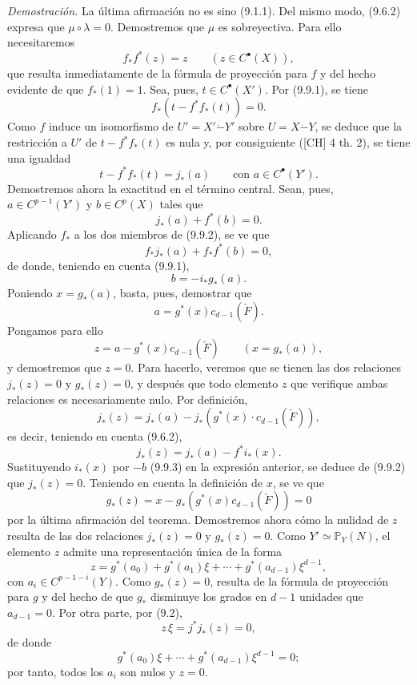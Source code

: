 \emph{Demostración.} La última afirmación no es sino (9.1.1). Del mismo modo, (9.6.2) expresa que $\mu\circ\lambda=0$. Demostremos que $\mu$ es sobreyectiva. Para ello necesitaremos
\[
f_*f^*(z)=z\qquad(z\in C^{\bullet}(X)),
\tag{9.9.1}
\]
que resulta inmediatamente de la fórmula de proyección para $f$ y del hecho evidente de que $f_*(1)=1$. Sea, pues, $t\in C^{\bullet}(X')$. Por (9.9.1), se tiene
\[
f_*(t-f^*f_*(t))=0.
\]
Como $f$ induce un isomorfismo de $U'=X'\mathbin{\dot{-}}Y'$ sobre $U=X\mathbin{\dot{-}}Y$, se deduce que la restricción a $U'$ de $t-f^*f_*(t)$ es nula y, por consiguiente ([CH] 4 th. 2), se tiene una igualdad
\[
t-f^*f_*(t)=j_*(a)
\qquad\text{con }a\in C^{\bullet}(Y').
\]
Demostremos ahora la exactitud en el término central. Sean, pues, $a\in C^{p-1}(Y')$ y $b\in C^p(X)$ tales que
\[
j_*(a)+f^*(b)=0.
\tag{9.9.2}
\]
Aplicando $f_*$ a los dos miembros de (9.9.2), se ve que
\[
f_*j_*(a)+f_*f^*(b)=0,
\]
de donde, teniendo en cuenta (9.9.1),
\[
b=-i_*g_*(a).
\tag{9.9.3}
\]
Poniendo $x=g_*(a)$, basta, pues, demostrar que
\[
a=g^*(x)c_{d-1}(\check F).
\tag{9.9.4}
\]
Pongamos para ello
\[
z=a-g^*(x)c_{d-1}(\check F)\qquad(x=g_*(a)),
\]
y demostremos que $z=0$. Para hacerlo, veremos que se tienen las dos relaciones $j_*(z)=0$ y $g_*(z)=0$, y después que todo elemento $z$ que verifique ambas relaciones es necesariamente nulo. Por definición,
\[
j_*(z)=j_*(a)-j_*(g^*(x)\cdot c_{d-1}(\check F)),
\]
es decir, teniendo en cuenta (9.6.2),
\[
j_*(z)=j_*(a)-f^*i_*(x).
\]
Sustituyendo $i_*(x)$ por $-b$ (9.9.3) en la expresión anterior, se deduce de (9.9.2) que $j_*(z)=0$. Teniendo en cuenta la definición de $x$, se ve que
\[
g_*(z)=x-g_*(g^*(x)c_{d-1}(\check F))=0
\]
por la última afirmación del teorema. Demostremos ahora cómo la nulidad de $z$ resulta de las dos relaciones $j_*(z)=0$ y $g_*(z)=0$. Como $Y'\simeq\mathbb P_Y(N)$, el elemento $z$ admite una representación única de la forma
\[
z=g^*(a_0)+g^*(a_1)\xi+\cdots+g^*(a_{d-1})\xi^{d-1},
\]
con $a_i\in C^{p-1-i}(Y)$. Como $g_*(z)=0$, resulta de la fórmula de proyección para $g$ y del hecho de que $g_*$ disminuye los grados en $d-1$ unidades que $a_{d-1}=0$. Por otra parte, por (9.2),
\[
z\,\xi=j^*j_*(z)=0,
\]
de donde
\[
g^*(a_0)\xi+\cdots+g^*(a_{d-1})\xi^{d-1}=0;
\]
por tanto, todos los $a_i$ son nulos y $z=0$.

